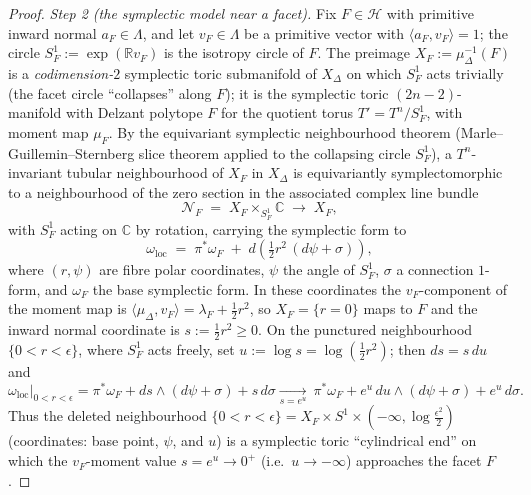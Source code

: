\documentclass{amsart}
\theoremstyle{definition}
\begin{document}
\begin{proof}
\emph{Step 2 (the symplectic model near a facet).} Fix $F\in\mathcal H$ with
primitive inward normal $a_F\in\Lambda$, and let $v_F\in\Lambda$ be a primitive
vector with $\langle a_F,v_F\rangle=1$; the circle $S^1_F:=\exp(\mathbb R v_F)$
is the isotropy circle of $F$. The preimage $X_F:=\mu_\Delta^{-1}(F)$ is a
\emph{codimension-$2$} symplectic toric submanifold of $X_\Delta$ on which
$S^1_F$ acts trivially (the facet circle ``collapses'' along $F$); it is the
symplectic toric $(2n-2)$-manifold with Delzant polytope $F$ for the quotient
torus $T'=T^n/S^1_F$, with moment map $\mu_F$. By the equivariant symplectic
neighbourhood theorem (Marle--Guillemin--Sternberg slice theorem applied to the
collapsing circle $S^1_F$), a $T^n$-invariant tubular neighbourhood of $X_F$ in
$X_\Delta$ is equivariantly symplectomorphic to a neighbourhood of the zero
section in the associated complex line bundle
\[
\mathcal N_F\;=\;X_F\times_{S^1_F}\mathbb C\;\longrightarrow\;X_F,
\]
with $S^1_F$ acting on $\mathbb C$ by rotation, carrying the symplectic form to
\begin{equation}\label{eq:facetnf}
\omega_{\mathrm{loc}}\;=\;\pi^*\omega_F\;+\;d\!\left(\tfrac12 r^2\,(d\psi+\sigma)\right),
\end{equation}
where $(r,\psi)$ are fibre polar coordinates, $\psi$ the angle of $S^1_F$,
$\sigma$ a connection $1$-form, and $\omega_F$ the base symplectic form. In
these coordinates the $v_F$-component of the moment map is
$\langle\mu_\Delta,v_F\rangle=\lambda_F+\tfrac12 r^2$, so $X_F=\{r=0\}$ maps to
$F$ and the inward normal coordinate is $s:=\tfrac12 r^2\ge0$. On the punctured
neighbourhood $\{0<r<\epsilon\}$, where $S^1_F$ acts freely, set $u:=\log s
=\log(\tfrac12 r^2)$; then $ds=s\,du$ and
\begin{equation}\label{eq:cylend}
\omega_{\mathrm{loc}}\big|_{0<r<\epsilon}
=\pi^*\omega_F+ds\wedge(d\psi+\sigma)+s\,d\sigma
\xrightarrow[s=e^u]{}\ \pi^*\omega_F+e^u\,du\wedge(d\psi+\sigma)+e^u\,d\sigma .
\end{equation}
Thus the deleted neighbourhood $\{0<r<\epsilon\}=X_F\times S^1\times(-\infty,
\log\tfrac{\epsilon^2}2)$ (coordinates: base point, $\psi$, and $u$) is a
symplectic toric ``cylindrical end'' on which the $v_F$-moment value
$s=e^u\to0^+$ (i.e.\ $u\to-\infty$) approaches the facet $F$.


\end{proof}
\end{document}
